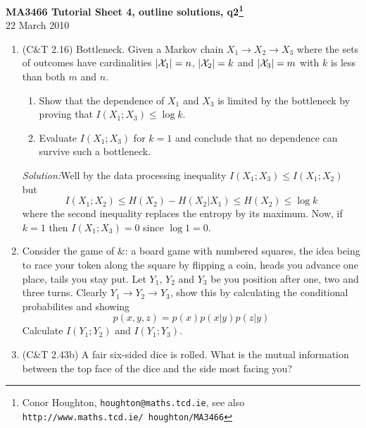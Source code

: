 \documentclass[12pt]{article}
\newcommand{\soln}{\noindent\textit{Solution:}}
\begin{document}
\begin{center}
{\bf MA3466 Tutorial Sheet 4, outline solutions, q2\footnote{Conor Houghton, {\tt houghton@maths.tcd.ie}, see also {\tt http://www.maths.tcd.ie/ houghton/MA3466}}}\\[1cm]{} 22 March 2010
\end{center}
\begin{enumerate}

\item (C\&T 2.16) Bottleneck. Given a Markov chain $X_1\rightarrow X_2\rightarrow X_3$ where the sets of outcomes have cardinalities $|{\cal X}_1|=n$, $|{\cal X}_2|=k$ and $|{\cal X}_3|=m$ with $k$ is less than both $m$ and $n$. 
\begin{enumerate}
\item Show that the dependence of $X_1$ and $X_3$ is limited by the bottleneck by proving that $I(X_1;X_3)\le \log{k}$.
\item Evaluate $I(X_1;X_3)$ for $k=1$ and conclude that no dependence can survive such a bottleneck.
\end{enumerate}

\soln Well by the data processing inequality $I(X_1;X_3)\le I(X_1;X_2)$ but
\begin{equation}
I(X_1;X_2)\le H(X_2)-H(X_2|X_1)\le H(X_2) \le \log{k}
\end{equation}
where the second inequality replaces the entropy by its maximum. Now,
if $k=1$ then $I(X_1;X_3)=0$ since $\log 1=0$.

\item Consider the game of $\&$\texttrademark: a board game with numbered squares, the idea being to race your token along the square by flipping a coin, heads you advance one place, tails you stay put. Let $Y_1$, $Y_2$ and $Y_3$ be you position after one, two and three turns. Clearly $Y_1\rightarrow Y_2 \rightarrow Y_3$, show this by calculating the conditional probabilites and showing
\begin{equation}
p(x,y,z)=p(x)p(x|y)p(z|y)
\end{equation}
Calculate $I(Y_1;Y_2)$ and $I(Y_1;Y_3)$.

\item (C\&T 2.43b) A fair six-sided dice is rolled. What is the mutual information between the top face of the dice and the side most facing you?


\end{enumerate}
\end{document}

